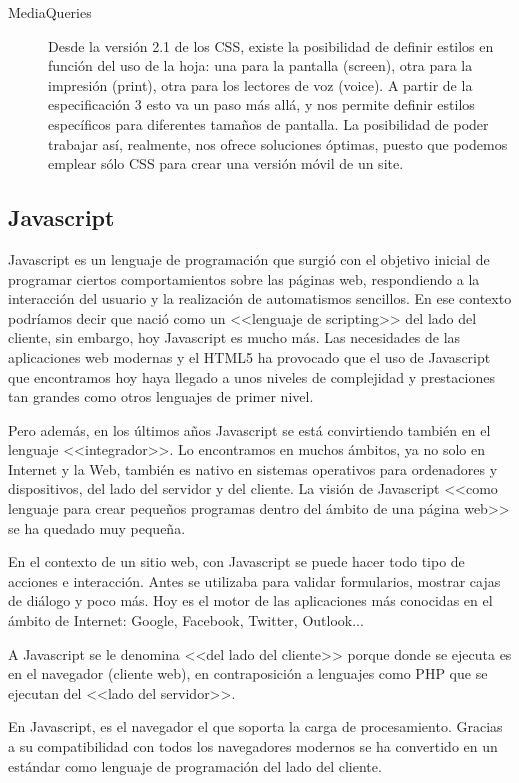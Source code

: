 \begin{description}
    \item[MediaQueries] Desde la versión 2.1 de los CSS, existe la posibilidad de definir estilos en función del uso de la hoja: una para la pantalla (screen), otra para la impresión (print), otra para los lectores de voz (voice). A partir de la especificación 3 esto va un paso más allá, y nos permite definir estilos específicos para diferentes tamaños de pantalla. La posibilidad de poder trabajar así, realmente, nos ofrece soluciones óptimas, puesto que podemos emplear sólo CSS para crear una versión móvil de un site.
\end{description}


\subsection{Javascript}

Javascript es un lenguaje de programación que surgió con el objetivo inicial de programar ciertos comportamientos sobre las páginas web, respondiendo a la interacción del usuario y la realización de automatismos sencillos. En ese contexto podríamos decir que nació como un <<lenguaje de scripting>> del lado del cliente, sin embargo, hoy Javascript es mucho más. Las necesidades de las aplicaciones web modernas y el HTML5 ha provocado que el uso de Javascript que encontramos hoy haya llegado a unos niveles de complejidad y prestaciones tan grandes como otros lenguajes de primer nivel.

Pero además, en los últimos años Javascript se está convirtiendo también en el lenguaje <<integrador>>. Lo encontramos en muchos ámbitos, ya no solo en Internet y la Web, también es nativo en sistemas operativos para ordenadores y dispositivos, del lado del servidor y del cliente. La visión de Javascript <<como lenguaje para crear pequeños programas dentro del ámbito de una página web>> se ha quedado muy pequeña.

En el contexto de un sitio web, con Javascript se puede hacer todo tipo de acciones e interacción. Antes se utilizaba para validar formularios, mostrar cajas de diálogo y poco más. Hoy es el motor de las aplicaciones más conocidas en el ámbito de Internet: Google, Facebook, Twitter, Outlook...

A Javascript se le denomina <<del lado del cliente>> porque donde se ejecuta es en el navegador (cliente web), en contraposición a lenguajes como PHP que se ejecutan del <<lado del servidor>>. 

En Javascript, es el navegador el que soporta la carga de procesamiento. Gracias a su compatibilidad con todos los navegadores modernos se ha convertido en un estándar como lenguaje de programación del lado del cliente.

